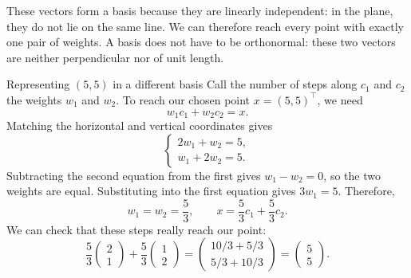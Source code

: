 \documentclass[a4paper,12pt,oneside]{report}
\begin{document}
These vectors form a basis because they are linearly independent:
in the plane, they do not lie on the same line. We can therefore reach
every point with exactly one pair of weights. A basis does not have
to be orthonormal: these two vectors are neither perpendicular nor
of unit length.

\begin{framedexample}{Representing $(5,5)$ in a different basis}
Call the number of steps along $c_1$ and $c_2$ the weights $w_1$ and
$w_2$. To reach our chosen point $x=(5,5)^\top$, we need
\[
  w_1c_1+w_2c_2=x.
\]
Matching the horizontal and vertical coordinates gives
\[
  \begin{cases}
    2w_1+w_2=5,\\
    w_1+2w_2=5.
  \end{cases}
\]
Subtracting the second equation from the first gives $w_1-w_2=0$,
so the two weights are equal. Substituting into the first equation
gives $3w_1=5$. Therefore,
\[
  w_1=w_2=\frac{5}{3},\qquad
  x=\frac{5}{3}c_1+\frac{5}{3}c_2.
\]
We can check that these steps really reach our point:
\[
  \frac53\begin{pmatrix}2\\1\end{pmatrix}
  +\frac53\begin{pmatrix}1\\2\end{pmatrix}
  =\begin{pmatrix}10/3+5/3\\5/3+10/3\end{pmatrix}
  =\begin{pmatrix}5\\5\end{pmatrix}.
\]
\begin{center}
\end{center}
\end{framedexample}
\end{document}
